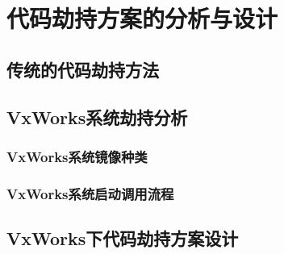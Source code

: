 \chapter{代码劫持方案的分析与设计}



 \section{传统的代码劫持方法}

  

 \section{VxWorks系统劫持分析}

  \subsection{VxWorks系统镜像种类}
  \subsection{VxWorks系统启动调用流程}


 \section{VxWorks下代码劫持方案设计}


